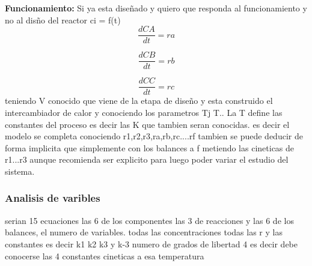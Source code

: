 \documentclass{report}
\begin{document}
\begin{raggedright}
	\textbf{Funcionamiento:}
Si ya esta diseñado y quiero que responda al funcionamiento y no al disño del reactor ci = f(t)
\begin{equation}
	\frac{dCA}{dt} = ra
\end{equation}

\begin{equation}
	\frac{dCB}{dt} = rb
\end{equation}

\begin{equation}
	\frac{dCC}{dt} = rc
\end{equation}
teniendo V conocido que viene de la etapa de diseño y esta construido el intercambiador de calor y conociendo los parametros Tj T..
La T define las constantes del proceso es decir las K que tambien seran conocidas.
es decir el modelo se completa conociendo r1,r2,r3,ra,rb,rc....rf tambien se puede deducir de forma implicita que simplemente con
los balances a f metiendo las cineticas de r1...r3 aunque recomienda ser explicito para luego poder variar el estudio del sistema.
\subsubsection{Analisis de varibles}
serian 15 ecuaciones las 6 de los componentes las 3 de reacciones y las 6 de los balances, el numero de variables. todas las concentraciones
todas las r y las constantes es decir k1 k2 k3 y k-3 
numero de grados de libertad 4 es decir debe conocerse las 4 constantes cineticas a esa temperatura


\end{raggedright}
\end{document}
